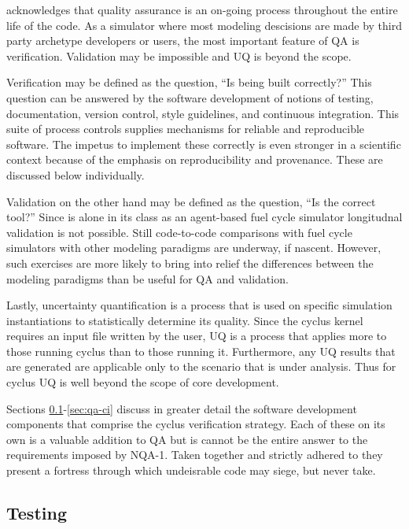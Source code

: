 \Cyclus acknowledges that quality assurance is an on-going process throughout the 
entire life of the code. As a simulator where most modeling descisions are made 
by third party archetype developers or users, the most important feature of
\gls{QA} 
is verification. Validation may be impossible and \gls{UQ} is beyond the scope.

Verification may be defined as the question, ``Is \Cyclus being built correctly?'' 
This question can be answered by the software development of notions of testing,
documentation, version control, style guidelines, and continuous integration. 
This suite of process controls supplies mechanisms for reliable and reproducible 
software. The impetus to implement these correctly is even stronger in a scientific 
context because of the emphasis on reproducibility and provenance. These are 
discussed below individually.

Validation on the other hand may be defined as the question, 
``Is \Cyclus the correct tool?''
Since \Cyclus is alone in its class as an agent-based fuel cycle simulator longitudnal 
validation is not possible. Still code-to-code comparisons with fuel cycle
simulators with other modeling paradigms are underway, if nascent. However, such 
exercises are more likely to bring into relief the differences between the modeling
paradigms than be useful for QA and validation. 

Lastly, uncertainty quantification is a process that is used on specific simulation
instantiations to statistically determine its quality. Since the cyclus 
kernel requires an input file written by the user, UQ is a process that applies 
more to those running cyclus than to those running it.  Furthermore, any UQ
results that are generated are applicable only to the scenario that is under 
analysis. Thus for cyclus UQ is well beyond the scope of core development.

Sections \ref{sec:qa-testing}-\ref{sec:qa-ci} discuss in greater detail the software 
development components that comprise the cyclus verification strategy.
Each of these on its own is a valuable addition to QA but is cannot be the 
entire answer to the requirements imposed by NQA-1. Taken together and strictly 
adhered to they present a fortress through which undeisrable code may siege, 
but never take.

\subsection{Testing}
\label{sec:qa-testing}

